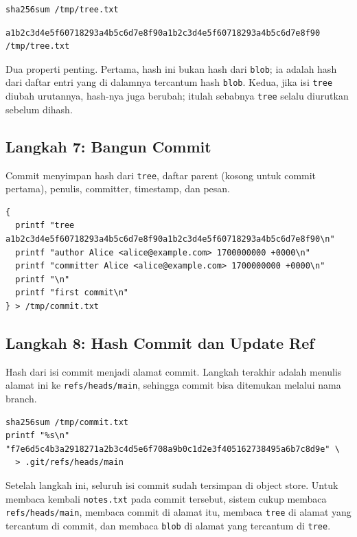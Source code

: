 \documentclass[11pt,a4paper]{article}
\begin{document}
\begin{lstlisting}[style=code]
sha256sum /tmp/tree.txt
\end{lstlisting}

\begin{lstlisting}[style=out]
a1b2c3d4e5f60718293a4b5c6d7e8f90a1b2c3d4e5f60718293a4b5c6d7e8f90  /tmp/tree.txt
\end{lstlisting}

Dua properti penting. Pertama, hash ini bukan hash dari \texttt{blob}; ia adalah hash dari daftar entri yang di dalamnya tercantum hash \texttt{blob}. Kedua, jika isi \texttt{tree} diubah urutannya, hash-nya juga berubah; itulah sebabnya \texttt{tree} selalu diurutkan sebelum dihash.

\subsection{Langkah 7: Bangun Commit}

Commit menyimpan hash dari \texttt{tree}, daftar parent (kosong untuk commit pertama), penulis, committer, timestamp, dan pesan.

\begin{lstlisting}[style=code]
{
  printf "tree a1b2c3d4e5f60718293a4b5c6d7e8f90a1b2c3d4e5f60718293a4b5c6d7e8f90\n"
  printf "author Alice <alice@example.com> 1700000000 +0000\n"
  printf "committer Alice <alice@example.com> 1700000000 +0000\n"
  printf "\n"
  printf "first commit\n"
} > /tmp/commit.txt
\end{lstlisting}

\subsection{Langkah 8: Hash Commit dan Update Ref}

Hash dari isi commit menjadi alamat commit. Langkah terakhir adalah menulis alamat ini ke \texttt{refs/heads/main}, sehingga commit bisa ditemukan melalui nama branch.

\begin{lstlisting}[style=code]
sha256sum /tmp/commit.txt
printf "%s\n" "f7e6d5c4b3a2918271a2b3c4d5e6f708a9b0c1d2e3f405162738495a6b7c8d9e" \
  > .git/refs/heads/main
\end{lstlisting}

Setelah langkah ini, seluruh isi commit sudah tersimpan di object store. Untuk membaca kembali \texttt{notes.txt} pada commit tersebut, sistem cukup membaca \texttt{refs/heads/main}, membaca commit di alamat itu, membaca \texttt{tree} di alamat yang tercantum di commit, dan membaca \texttt{blob} di alamat yang tercantum di \texttt{tree}.
\end{document}
